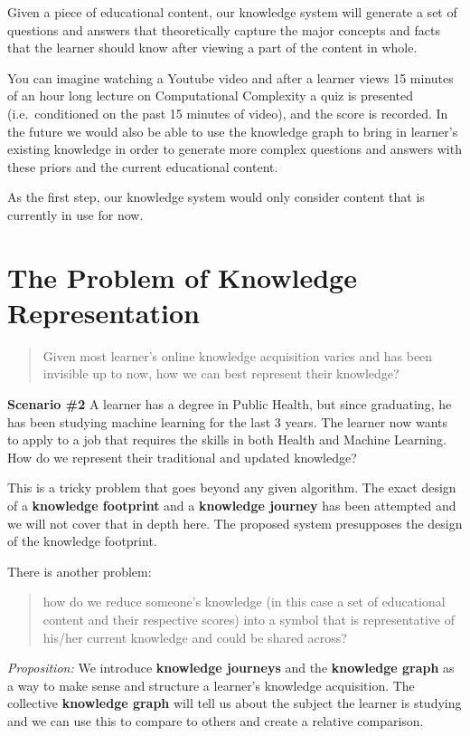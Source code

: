 \documentclass[]{book}
\theoremstyle{definition}
\theoremstyle{definition}
\theoremstyle{definition}
\theoremstyle{remark}
\begin{document}
Given a piece of educational content, our knowledge system will generate
a set of questions and answers that theoretically capture the major
concepts and facts that the learner should know after viewing a part of
the content in whole.

You can imagine watching a Youtube video and after a learner views 15
minutes of an hour long lecture on Computational Complexity a quiz is
presented (i.e.~conditioned on the past 15 minutes of video), and the
score is recorded. In the future we would also be able to use the
knowledge graph to bring in learner's existing knowledge in order to
generate more complex questions and answers with these priors and the
current educational content.

As the first step, our knowledge system would only consider content that
is currently in use for now.

\section{The Problem of Knowledge
Representation}\label{the-problem-of-knowledge-representation}

\begin{quote}
Given most learner's online knowledge acquisition varies and has been
invisible up to now, how we can best represent their knowledge?
\end{quote}

\textbf{Scenario \#2} A learner has a degree in Public Health, but since
graduating, he has been studying machine learning for the last 3 years.
The learner now wants to apply to a job that requires the skills in both
Health and Machine Learning. How do we represent their traditional and
updated knowledge?

This is a tricky problem that goes beyond any given algorithm. The exact
design of a \textbf{knowledge footprint} and a \textbf{knowledge
journey} has been attempted and we will not cover that in depth here.
The proposed system presupposes the design of the knowledge footprint.

There is another problem:

\begin{quote}
how do we reduce someone's knowledge (in this case a set of educational
content and their respective scores) into a symbol that is
representative of his/her current knowledge and could be shared across?
\end{quote}

\emph{Proposition:} We introduce \textbf{knowledge journeys} and the
\textbf{knowledge graph} as a way to make sense and structure a
learner's knowledge acquisition. The collective \textbf{knowledge graph}
will tell us about the subject the learner is studying and we can use
this to compare to others and create a relative comparison.
\end{document}
